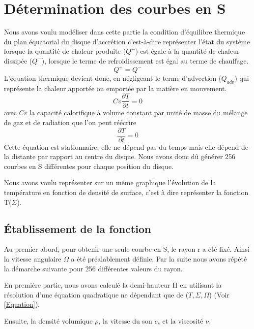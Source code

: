 \section{Détermination des courbes en S}
\label{sec:courbe_s}

Nous avons voulu modéliser dans cette partie la condition d'équilibre thermique du plan équatorial du disque d'accrétion c'est-à-dire représenter l'état du système lorsque la quantité de chaleur produite ($Q^+$) est égale à la quantité de chaleur dissipée ($Q^-$), lorsque le terme de refroidissement est égal au terme de chauffage.
\begin{equation}
Q^+ = Q^-
\end{equation}
L'équation thermique devient donc, en négligeant le terme d'advection ($Q_{adv}$) qui représente la chaleur apportée ou emportée par la matière en mouvement.
\begin{equation}
Cv\frac{\partial T}{\partial t} = 0
\end{equation}
avec $Cv$ la capacité calorifique à volume constant par unité de masse du mélange de gaz et de radiation que l'on peut réécrire
\begin{equation}
\frac{\partial T}{\partial t} = 0
\end{equation}
Cette équation est stationnaire, elle ne dépend pas du temps mais elle dépend de la distante par rapport au centre du disque. Nous avons donc dû générer 256 courbes en S différentes pour chaque position du disque.

Nous avons voulu représenter sur un même graphique l'évolution de la température en fonction de densité de surface, c'est à dire représenter la fonction T($\Sigma$).
   

\subsection{Établissement de la fonction}

Au premier abord, pour obtenir une seule courbe en S, le rayon r a été fixé. Ainsi la vitesse angulaire $\Omega$ a été préalablement définie. Par la suite nous avons répété la démarche suivante pour 256 différentes valeurs du rayon.

En première partie, nous avons calculé la demi-hauteur H en utilisant la résolution d'une équation quadratique ne dépendant que de ($T,\Sigma,\Omega$) (Voir \ref{Equation}).

Ensuite, la densité volumique $\rho$, la vitesse du son $c_s$ et la viscosité $\nu$. 

